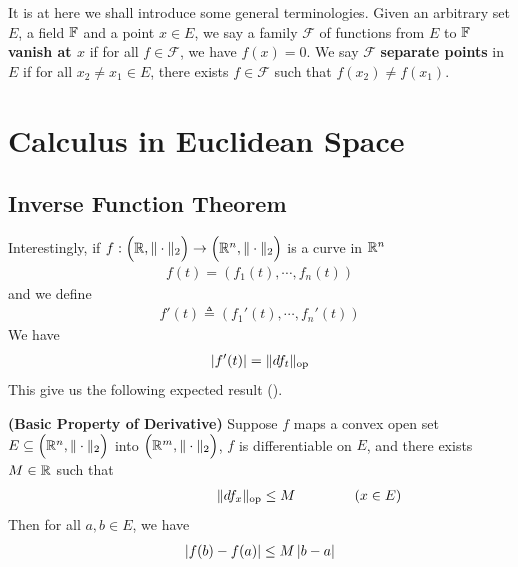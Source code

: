 \documentclass{report}
\begin{document}
\begin{mdframed}
It is at here we shall introduce some general terminologies. Given an arbitrary set $E$, a field  $\mathbb{F}$ and a point $x \in E$, we say a family $\mathcal{F}$ of functions  from $E$ to  $\mathbb{F}$  \textbf{vanish at $x$} if for all $f \in \mathcal{F}$, we have $f(x)=0$. We say $\mathcal{F}$ \textbf{separate points} in $E$ if for all  $x_2\neq x_1 \in E$, there exists $f\in \mathcal{F}$ such that $f(x_2)\neq f(x_1)$. 
\end{mdframed}

\chapter{Calculus in Euclidean Space}
\section{Inverse Function Theorem}
\begin{mdframed}
Interestingly, if $f:\Big(\mathbb{R},\| \cdot \|_2 \Big)\rightarrow \Big(\mathbb{R}^n , \| \cdot \|_2\Big)$ is a curve in $\mathbb{R}^n$ 
\begin{align*}
f(t)=(f_1(t),\cdots , f_n(t))
\end{align*}
and we define 
\begin{align*}
f'(t)\triangleq (f_1'(t),\cdots ,f_n'(t))
\end{align*}
We have 
\begin{align*}
\left|f'(t)\right|= \| df_t \|_{\text{op}}
\end{align*}
This give us the following expected result (). 
\end{mdframed}
\begin{theorem}
\label{BPoDB}
\textbf{(Basic Property of Derivative)} Suppose $f$ maps a convex open set $E\subseteq \Big(\mathbb{R}^n,\| \cdot \|_2 \Big)$ into $\Big(\mathbb{R}^m,\| \cdot \|_2 \Big)$,  $f$ is differentiable on $E$, and there exists $M\in\mathbb{R}$ such that 
\begin{align*}
\hspace{2.5cm}\| df_x \|_\text{op}\leq M\hspace{1.5cm}(x \in E)
\end{align*}
Then for all $a,b \in E$, we have
\begin{align*}
\left|f(b)-f(a)\right|\leq M \left|b-a\right|
\end{align*}
\end{theorem}
\end{document}
